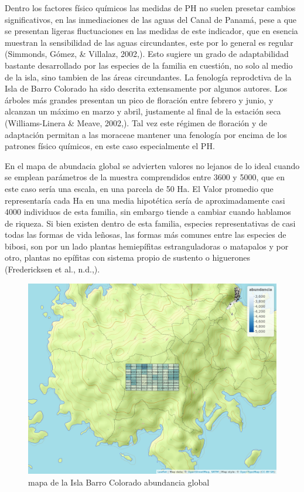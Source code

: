 \documentclass[11pt,]{article}
\begin{document}
Dentro los factores físico químicos las medidas de PH no suelen presetar
cambios significativos, en las inmediaciones de las aguas del Canal de
Panamá, pese a que se presentan ligeras fluctuaciones en las medidas de
este indicador, que en esencia muestran la sensibilidad de las aguas
circundantes, este por lo general es regular (Simmonds, Gómez, \&
Villalaz, 2002,). Esto sugiere un grado de adaptabilidad bastante
desarrollado por las especies de la familia en cuestión, no solo al
medio de la isla, sino tambien de las áreas circundantes. La fenología
reprodctiva de la Isla de Barro Colorado ha sido descrita extensamente
por algunos autores. Los árboles más grandes presentan un pico de
floración entre febrero y junio, y alcanzan un máximo en marzo y abril,
justamente al final de la estación seca (Williams-Linera \& Meave,
2002,). Tal vez este régimen de floración y de adaptación permitan a las
moraceae mantener una fenología por encima de los patrones físico
químicos, en este caso especialmente el PH.

En el mapa de abundacia global se advierten valores no lejanos de lo
ideal cuando se emplean parámetros de la muestra comprendidos entre 3600
y 5000, que en este caso sería una escala, en una parcela de 50 Ha. El
Valor promedio que representaría cada Ha en una media hipotética sería
de aproximadamente casi 4000 individuos de esta familia, sin embargo
tiende a cambiar cuando hablamos de riqueza. Si bien existen dentro de
esta familia, especies representativas de casi todas las formas de vida
leñosas, las formas más comunes entre las especies de bibosi, son por un
lado plantas hemiepífitas estranguladoras o matapalos y por otro,
plantas no epífitas con sistema propio de sustento o higuerones
(Fredericksen et al., n.d.,).

\begin{figure}
\centering
\includegraphics[width=1.00000\textwidth]{mapa_cuadros_abun_global.png}
\caption{mapa de la Isla Barro Colorado abundancia global
\label{fig:bci_map}}
\end{figure}
\end{document}
